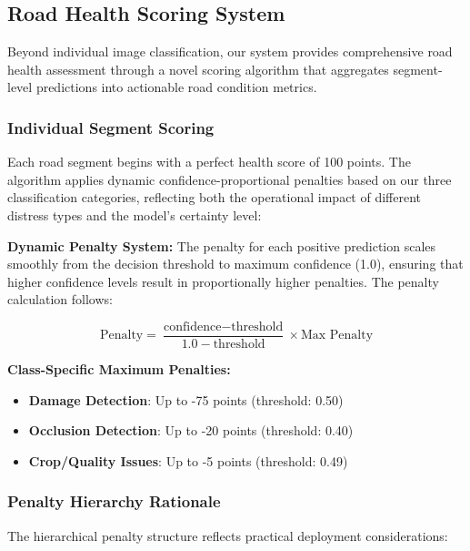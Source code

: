 \documentclass[12pt]{article}
\begin{document}
\subsection{Road Health Scoring System}

Beyond individual image classification, our system provides comprehensive road health assessment through a novel scoring algorithm that aggregates segment-level predictions into actionable road condition metrics.

\subsubsection{Individual Segment Scoring}

Each road segment begins with a perfect health score of 100 points. The algorithm applies dynamic confidence-proportional penalties based on our three classification categories, reflecting both the operational impact of different distress types and the model's certainty level:

\textbf{Dynamic Penalty System:}
The penalty for each positive prediction scales smoothly from the decision threshold to maximum confidence (1.0), ensuring that higher confidence levels result in proportionally higher penalties. The penalty calculation follows:

$$\text{Penalty} = \frac{\text{confidence} - \text{threshold}}{1.0 - \text{threshold}} \times \text{Max Penalty}$$

\textbf{Class-Specific Maximum Penalties:}
\begin{itemize}[itemsep=1pt,parsep=0pt,topsep=2pt]
\item \textbf{Damage Detection}: Up to -75 points (threshold: 0.50)
\item \textbf{Occlusion Detection}: Up to -20 points (threshold: 0.40) 
\item \textbf{Crop/Quality Issues}: Up to -5 points (threshold: 0.49)
\end{itemize}

\subsubsection{Penalty Hierarchy Rationale}

The hierarchical penalty structure reflects practical deployment considerations:
\end{document}
